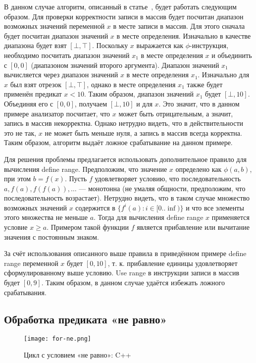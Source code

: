 В данном случае алгоритм, описанный в статье~\cite{li2010practical},
будет работать следующим образом. Для проверки корректности записи в
массив будет посчитан диапазон возможных значений переменной $x$ в
месте записи в массив. Для этого сначала будет посчитан диапазон
значений $x$ в месте определения. Изначально в качестве диапазона
будет взят $[\bot, \top]$. Поскольку $x$ выражается как
$\phi$-инструкция, необходимо посчитать диапазон значений $x_1$ в
месте определения $x$ и объединить с $[0, 0]$ (диапазоном значений
второго аргумента). Диапазон значений $x_1$ вычисляется через диапазон
значений $x$ в месте определения $x_1$. Изначально для $x$ был взят
отрезок $[\bot, \top]$, однако в месте определения $x_1$ также будет
применён предикат $x < 10$. Таким образом, диапазон значений $x_1$
будет $[\bot, 10]$. Объединяя его с $[0, 0]$, получаем $[\bot, 10]$ и
для $x$. Это значит, что в данном примере анализатор посчитает, что
$x$ может быть отрицательным, а значит, запись в массив
некорректна. Однако нетрудно видеть, что в действительности это не
так, $x$ не может быть меньше нуля, а запись в массив всегда
корректна. Таким образом, алгоритм выдаёт ложное срабатывание на
данном примере.

Для решения проблемы предлагается использовать дополнительное правило
для вычисления define range. Предположим, что значение $x$ определено
как $\phi(a, b)$, при этом $b = f(x)$. Пусть $f$ удовлетворяет
условию, что последовательность $a, f(a), f(f(a)), \dots$ ---
монотонна (не умаляя общности, предположим, что последовательность
возрастает). Нетрудно видеть, что в таком случае множество возможных
значений $x$ содержится в $\{f^i(a) : i \in [0 .. \inf)\}$ и что все
элементы этого множества не меньше $a$.  Тогда для вычисления define
range $x$ применяется условие $x \geq a$. Примером такой функции $f$
является прибавление или вычитание значения с постоянным знаком.

За счёт использования описанного выше правила в приведённом примере
define range переменной $x$ будет $[0, 10]$, т. к. прибавление единицы
удовлетворяет сформулированному выше условию. Use range в инструкции
записи в массив будет $[0, 9]$. Таким образом, в данном случае удаётся
избежать ложного срабатывания.

\subsection{Обработка предиката «не равно»}

\begin{figure}
    \texttt{[image: for-ne.png]}
    \caption{Цикл с условием «не равно»: C++}
    \label{fig:for-ne-cpp}
\end{figure}

